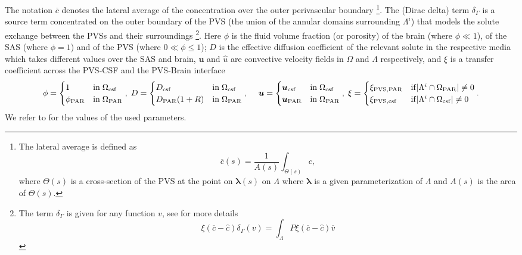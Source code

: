 \documentclass[fleqn,10pt]{wlscirep}
\begin{document}
The notation $\overline{c}$ denotes the lateral average of the concentration over the outer perivascular boundary \footnote{
The lateral average is defined as 
\[ \overline{c}(s) = \frac{1}{A(s)} \int_{\Theta(s)} c ,\]
where $\Theta(s)$ is a cross-section of the PVS at the point on $\bm{\lambda}(s)$ on $\Lambda$ where $\bm \lambda$ is a given parameterization of $\Lambda$ and $A(s)$ is the area of $\Theta(s)$. 
}. The (Dirac delta) term $\delta_\Gamma$ is a source term concentrated on the outer boundary of the PVS (the union of the annular domains surrounding $\Lambda^i$) that models the solute exchange between the PVSs and their surroundings \footnote{The term $\delta_{\Gamma}$ is given for any function $v$, see  for more details
\[\xi  (\overline{c} - \hat c ) \delta_\Gamma (v) 
= \int_{\Lambda} P \xi ( \overline{c} - \hat c ) \overline{v} 
\]
}.  
Here $\phi$ is the fluid volume fraction (or porosity) of the brain (where $\phi \ll 1$), of the SAS (where $\phi = 1$) and of the PVS (where $0 \ll \phi \leq 1$); $D$ is the effective diffusion coefficient of the relevant solute in the respective media~\cite{sykova2008diffusion} which takes different values over the SAS and brain,  $\bm u$ and $\hat u$ are convective velocity fields in $\Omega$ and $\Lambda$ respectively, and $\xi$ is a transfer coefficient across the PVS-CSF and the PVS-Brain interface
\[
\phi =  \begin{cases}
    1  & \mathrm{in} \;  \Omega_{\rm{csf}} \\ 
    \phi_{\rm{PAR}} & \mathrm{in} \; \Omega_{\rm{PAR}} 
    \end{cases}, \; 
 D= \begin{cases}
    D_{\rm{csf}} & \mathrm{in} \;  \Omega_{\rm{csf}} \\ 
    D_{\rm{PAR}} (1+ R) & \mathrm{in} \; \Omega_{\rm{PAR}} \end{cases}, \; 
    \quad \bm u  = \begin{cases}
    \bm{u}_{\rm{csf}} & \mathrm{in} \; \Omega_{\rm{csf}} \\ 
    \bm{u}_{\rm{PAR}} & \mathrm{in} \; \Omega_{\rm{PAR}} 
\end{cases}, \; 
\xi = \begin{cases}
 \xi_{\rm{PVS}, \rm{PAR}} & \mathrm{if} |\Lambda^i \cap \Omega_{\rm{PAR}}| \neq 0 \\ 
  \xi_{\rm{PVS}, \rm{csf}} & \mathrm{if} |\Lambda^i \cap \Omega_{\rm{csf}}| \neq 0
\end{cases} . 
\]
We refer to  for the values of the used parameters.
\end{document}
